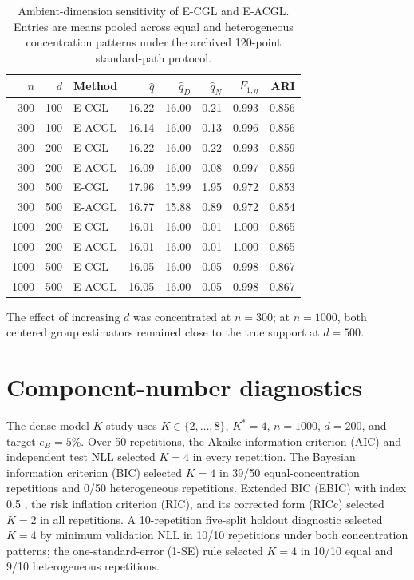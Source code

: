 \documentclass[preprint,12pt,authoryear]{elsarticle}
\begin{document}
\begin{table}[H]
\centering
\footnotesize
\setlength{\tabcolsep}{3pt}
\caption{Ambient-dimension sensitivity of E-CGL and E-ACGL. Entries are means
pooled across equal and heterogeneous concentration patterns under the
archived 120-point standard-path protocol.}
\label{tab:s-ambient-dimension}
\begin{tabular}{rrlrrrrr}
\toprule
$n$ & $d$ & Method & $\widehat q$ & $\widehat q_D$ & $\widehat q_N$ & $F_{1,\eta}$ & ARI \\
\midrule
300 & 100 & E-CGL & 16.22 & 16.00 & 0.21 & 0.993 & 0.856 \\
300 & 100 & E-ACGL & 16.14 & 16.00 & 0.13 & 0.996 & 0.856 \\
300 & 200 & E-CGL & 16.22 & 16.00 & 0.22 & 0.993 & 0.859 \\
300 & 200 & E-ACGL & 16.09 & 16.00 & 0.08 & 0.997 & 0.859 \\
300 & 500 & E-CGL & 17.96 & 15.99 & 1.95 & 0.972 & 0.853 \\
300 & 500 & E-ACGL & 16.77 & 15.88 & 0.89 & 0.972 & 0.854 \\
1000 & 200 & E-CGL & 16.01 & 16.00 & 0.01 & 1.000 & 0.865 \\
1000 & 200 & E-ACGL & 16.01 & 16.00 & 0.01 & 1.000 & 0.865 \\
1000 & 500 & E-CGL & 16.05 & 16.00 & 0.05 & 0.998 & 0.867 \\
1000 & 500 & E-ACGL & 16.05 & 16.00 & 0.05 & 0.998 & 0.867 \\
\bottomrule
\end{tabular}
\end{table}

The effect of increasing $d$ was concentrated at $n=300$; at $n=1000$, both
centered group estimators remained close to the true support at $d=500$.

\section{Component-number diagnostics}
\label{sec:s-component-number}

The dense-model $K$ study uses $K\in\{2,\ldots,8\}$, $K^\ast=4$, $n=1000$,
$d=200$, and target $e_B=5\%$. Over 50 repetitions, the Akaike information
criterion (AIC) \citep{akaike1974aic} and independent test NLL selected $K=4$
in every repetition. The Bayesian information criterion (BIC)
\citep{schwarz1978bic} selected $K=4$ in 39/50 equal-concentration repetitions
and 0/50 heterogeneous repetitions. Extended BIC (EBIC) with index 0.5
\citep{chen2008ebic}, the risk inflation criterion (RIC), and its corrected
form (RICc) selected $K=2$ in all repetitions. A 10-repetition five-split
holdout diagnostic selected $K=4$ by minimum validation NLL in 10/10
repetitions under both concentration patterns; the one-standard-error (1-SE)
rule selected $K=4$
in 10/10 equal and 9/10 heterogeneous repetitions.
\end{document}
